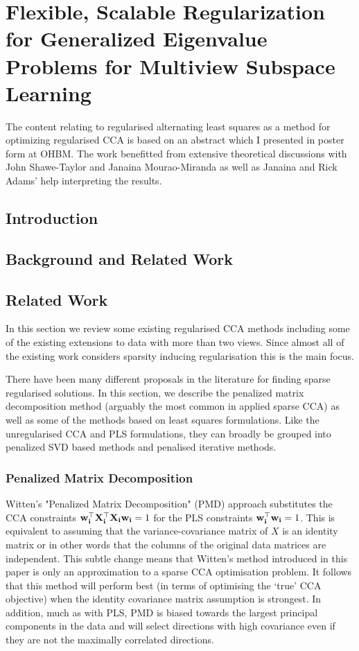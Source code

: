 \chapter{Flexible, Scalable Regularization for Generalized Eigenvalue Problems for Multiview Subspace Learning}
\label{Regularised}

The content relating to regularised alternating least squares as a method for optimizing regularised CCA is based on an abstract which I presented in poster form at OHBM. The work benefitted from extensive theoretical discussions with John Shawe-Taylor and Janaina Mourao-Miranda as well as Janaina and Rick Adams' help interpreting the results.

\section{Introduction}


\section{Background and Related Work}

\section{Related Work}

In this section we review some existing regularised CCA methods including some of the existing extensions to data with more than two views. Since almost all of the existing work considers sparsity inducing regularisation this is the main focus.

There have been many different proposals in the literature for finding sparse regularised solutions. In this section, we describe the penalized matrix decomposition method (arguably the most common in applied sparse CCA) as well as some of the methods based on least squares formulations. Like the unregularised CCA and PLS formulations, they can broadly be grouped into penalized SVD based methods and penalised iterative methods.

\subsection{Penalized Matrix Decomposition}\label{sec:witten}

Witten's "Penalized Matrix Decomposition" (PMD) \cite{witten2009penalized} approach substitutes the CCA constraints $\bold{w_i^{\top}X_i^{\top}X_iw_i}=1$ for the PLS constraints $\bold{w_i^{\top}w_i}=1$. This is equivalent to assuming that the variance-covariance matrix of $X$ is an identity matrix or in other words that the columns of the original data matrices are independent. This subtle change means that Witten's method introduced in this paper is only an approximation to a sparse CCA optimisation problem. It follows that this method will perform best (in terms of optimising the `true' CCA objective) when the identity covariance matrix assumption is strongest. In addition, much as with PLS, PMD is biased towards the largest principal components in the data and will select directions with high covariance even if they are not the maximally correlated directions.

